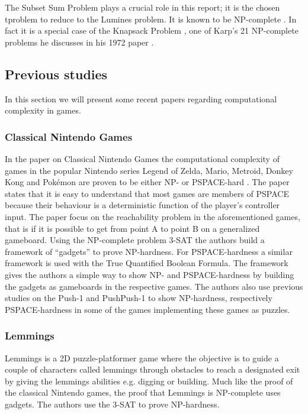 The Subset Sum Problem plays a crucial role in this report; it is the chosen tproblem to reduce to the Lumines problem. It is known to be NP-complete \cite[p.~492]{algorithm}. In fact it is a special case of the Knapsack Problem \cite[p.~491]{algorithm}, one of Karp's 21 NP-complete problems he discusses in his 1972 paper \cite{karp}.

\subsection{Previous studies}

In this section we will present some recent papers regarding computational complexity in games.

\subsubsection{Classical Nintendo Games}

In the paper on Classical Nintendo Games the computational complexity of games in the popular Nintendo series Legend of Zelda, Mario, Metroid, Donkey Kong and Pokémon are proven to be either NP- or PSPACE-hard \cite{classic}. The paper states that it is easy to understand that most games are members of PSPACE because their behaviour is a deterministic function of the player's controller input. The paper focus on the reachability problem in the aforementioned games, that is if it is possible to get from point A to point B on a generalized gameboard. Using the NP-complete problem 3-SAT the authors build a framework of ``gadgets'' to prove NP-hardness. For PSPACE-hardness a similar framework is used with the True Quantified Boolean Formula. The framework gives the authors a simple way to show NP- and PSPACE-hardness by building the gadgets as gameboards in the respective games. The authors also use previous studies on the Push-1 \cite{push1} and PushPush-1 \cite{pushpushk} to show NP-hardness, respectively PSPACE-hardness in some of the games implementing these games as puzzles. 

\subsubsection{Lemmings}

Lemmings is a 2D puzzle-platformer game where the objective is to guide a couple of characters called lemmings through obstacles to reach a designated exit by giving the lemmings abilities e.g. digging or building. Much like the proof of the classical Nintendo games, the proof that Lemmings is NP-complete uses gadgets. The authors use the 3-SAT to prove NP-hardness. 

